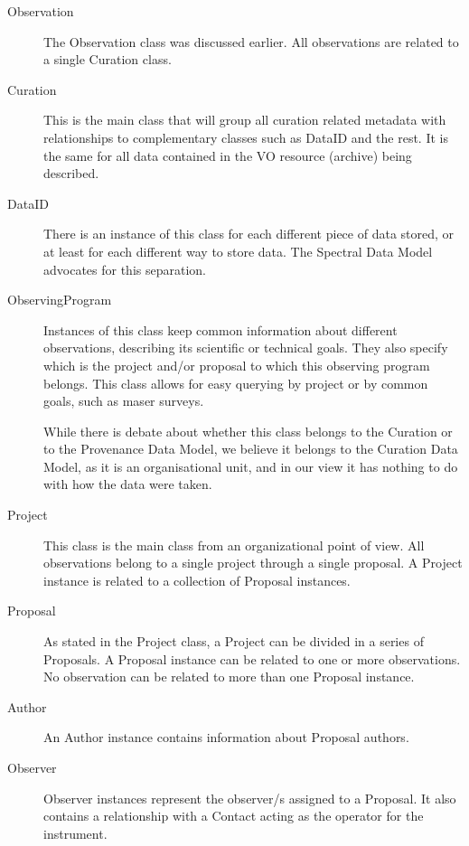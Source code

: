		\begin{description}
			\item[Observation]  The Observation class was
			discussed earlier. All observations are related to a single
			Curation class.

			\item[Curation]  This is the main class that will group
			all curation related metadata with relationships to
			complementary classes such as DataID and the rest.
			It is the same for all data contained in the VO resource
			(archive) being described.

			\item[DataID]  There is an instance of this class for
			each different piece of data stored, or at least for each
			different way to store data. The Spectral Data Model
			advocates for this separation.

			\item[ObservingProgram]  Instances of this class keep
			common information about different observations, describing
			its scientific or technical goals. They also specify which
			is the project and/or proposal to which this observing
			program belongs. This class allows for easy querying by
			project or by common goals, such as maser surveys.

			While there is debate about whether this class belongs to
			the Curation or to the Provenance Data Model, we believe it
			belongs to the Curation Data Model, as it is an
			organisational unit, and in our view it has nothing to do
			with how the data were taken.

			\item[Project]  This class is the main class from an
			organizational point of view. All observations belong to a
			single project through a single proposal. A
			Project instance is related to a collection of
			Proposal instances.

			\item[Proposal]  As stated in the Project
			class, a Project can be divided in a series of
			Proposals. A Proposal instance can be
			related to one or more observations. No observation can be
			related to more than one Proposal instance.

			\item[Author]  An Author instance contains
			information about Proposal authors.

			\item[Observer]  Observer instances represent
			the observer/s assigned to a Proposal. It also
			contains a relationship with a Contact acting as
			the operator for the instrument.


\end{description}
